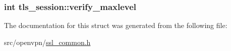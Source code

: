\subsubsection[{verify\+\_\+maxlevel}]{\setlength{\rightskip}{0pt plus 5cm}int tls\+\_\+session\+::verify\+\_\+maxlevel}\label{structtls__session_a9b8993f2c4525caa43cb88b00a20bada}


The documentation for this struct was generated from the following file\+:\begin{DoxyCompactItemize}
\item 
src/openvpn/\hyperlink{ssl__common_8h}{ssl\+\_\+common.\+h}\end{DoxyCompactItemize}
